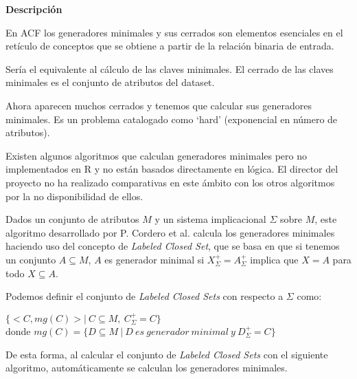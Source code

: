 \textbf{Descripci\'on} 

En ACF los generadores minimales y sus cerrados son elementos esenciales en el ret\'iculo de conceptos  que se obtiene a partir de la relaci\'on binaria de entrada. 

Ser\'ia el equivalente al c\'alculo de las claves minimales. El cerrado de las claves minimales es el conjunto de atributos del dataset. 

Ahora aparecen muchos cerrados y tenemos que calcular sus generadores minimales. Es un problema catalogado como \enquote*{hard} (exponencial en n\'umero de atributos).

Existen algunos algoritmos que  calculan generadores minimales pero no implementados en R y no est\'an basados directamente en l\'ogica. El director del proyecto no ha realizado comparativas en este \'ambito con los otros algoritmos por la no disponibilidad de ellos.



Dados un conjunto de atributos \(M\) y un sistema implicacional \(\Sigma\) sobre \(M\), este algoritmo desarrollado por P. Cordero et al. \cite{LCS} calcula los generadores minimales haciendo uso del concepto de \textit{Labeled Closed Set}, que se basa en que si tenemos un conjunto \(A \subseteq M\), \(A\) es generador minimal si \(X^+_{\Sigma} = A^+_{\Sigma}\) implica que \(X = A\) para todo  \(X \subseteq A\). 

Podemos definir el conjunto de \textit{Labeled Closed Sets} con respecto a \(\Sigma\) como:
\begin{center}
    \(\{<C,mg(C)> | \ C \subseteq M, \ C^+_{\Sigma} = C \}\)\\
    donde \(mg(C) = \{D \subseteq M \ | \ D \ es \ generador \ minimal \ y \ D^+_{\Sigma} = C \}\)
\end{center}

De esta forma, al calcular el conjunto de \textit{Labeled Closed Sets} con el siguiente algoritmo, autom\'aticamente se calculan los generadores minimales.\\

